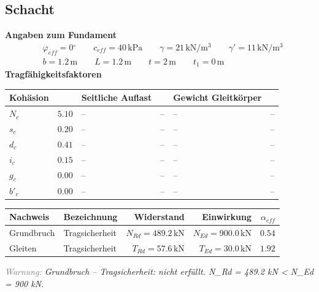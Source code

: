 \documentclass[11pt,a4paper]{article}
\newcommand{\hinweis}[2]{\par\noindent\textcolor{gray}{\textit{#1:}} \textit{#2}\par}
\begin{document}
\subsection{Schacht}
\noindent\textbf{Angaben zum Fundament}
\begin{equation*}
\begin{aligned} & \varphi_{eff} = 0{}^{\circ} \qquad c_{eff} = 40\,\mathrm{kPa} \qquad \gamma = 21\,\mathrm{kN}/\mathrm{m}^{3} \qquad \gamma' = 11\,\mathrm{kN}/\mathrm{m}^{3} \\ & b = 1.2\,\mathrm{m} \qquad L = 1.2\,\mathrm{m} \qquad t = 2\,\mathrm{m} \qquad t_1 = 0\,\mathrm{m} \end{aligned}
\end{equation*}
\noindent\textbf{Tragfähigkeitsfaktoren}
\begin{longtable}{lrlrlr}
\hline
Kohäsion &  & Seitliche Auflast &  & Gewicht Gleitkörper &  \\
\hline
\endhead
$N_{c}$ & $5.10$ & – & – & – & – \\
$s_{c}$ & $0.20$ & – & – & – & – \\
$d_{c}$ & $0.41$ & – & – & – & – \\
$i_{c}$ & $0.15$ & – & – & – & – \\
$g_{c}$ & $0.00$ & – & – & – & – \\
$b'_{c}$ & $0.00$ & – & – & – & – \\
\hline
\end{longtable}
\begin{xltabular}{\linewidth}{>{\raggedright\arraybackslash}X>{\raggedright\arraybackslash}Xrrr}
\hline
Nachweis & Bezeichnung & Widerstand & Einwirkung & $\alpha_{eff}$ \\
\hline
\endhead
Grundbruch & Tragsicherheit & $N_{Rd} = 489.2\,\mathrm{kN}$ & $N_{Ed} = 900.0\,\mathrm{kN}$ & $0.54$ \\
Gleiten & Tragsicherheit & $T_{Rd} = 57.6\,\mathrm{kN}$ & $T_{Ed} = 30.0\,\mathrm{kN}$ & $1.92$ \\
\hline
\end{xltabular}
\hinweis{Warnung}{Grundbruch – Tragsicherheit: nicht erfüllt. N\_Rd = 489.2 kN < N\_Ed = 900 kN.}
\end{document}
